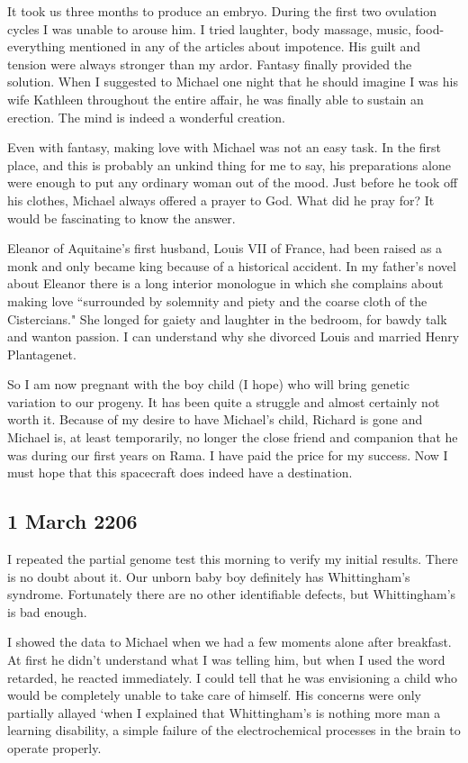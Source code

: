 \documentclass[]{article}
\begin{document}
It took us three months to produce an embryo.  During the first two ovulation cycles I was unable to arouse him.  I tried laughter, body massage, music, food-everything mentioned in any of the articles about impotence.  His guilt and tension were always stronger than my ardor.  Fantasy finally provided the solution.  When I suggested to Michael one night that he should imagine I was his wife Kathleen throughout the entire affair, he was finally able to sustain an erection.  The mind is indeed a wonderful creation.

Even with fantasy, making love with Michael was not an easy task.  In the first place, and this is probably an unkind thing for me to say, his preparations alone were enough to put any ordinary woman out of the mood.  Just before he took off his clothes, Michael always offered a prayer to God.  What did he pray for? It would be fascinating to know the answer.

Eleanor of Aquitaine’s first husband, Louis VII of France, had been raised as a monk and only became king because of a historical accident.  In my father’s novel about Eleanor there is a long interior monologue in which she complains about making love “surrounded by solemnity and piety and the coarse cloth of the Cistercians."  She longed for gaiety and laughter in the bedroom, for bawdy talk and wanton passion.  I can understand why she divorced Louis and married Henry Plantagenet.

So I am now pregnant with the boy child (I hope) who will bring genetic variation to our progeny.  It has been quite a struggle and almost certainly not worth it.  Because of my desire to have Michael’s child, Richard is gone and Michael is, at least temporarily, no longer the close friend and companion that he was during our first years on Rama.  I have paid the price for my success.  Now I must hope that this spacecraft does indeed have a destination.

\subsection*{1 March 2206}

I repeated the partial genome test this morning to verify my initial results.  There is no doubt about it.  Our unborn baby boy definitely has Whittingham’s syndrome.  Fortunately there are no other identifiable defects, but Whittingham’s is bad enough.

I showed the data to Michael when we had a few moments alone after breakfast.  At first he didn’t understand what I was telling him, but when I used the word retarded, he reacted immediately.  I could tell that he was envisioning a child who would be completely unable to take care of himself.  His concerns were only partially allayed ‘when I explained that Whittingham’s is nothing more man a learning disability, a simple failure of the electrochemical processes in the brain to operate properly.
\end{document}
